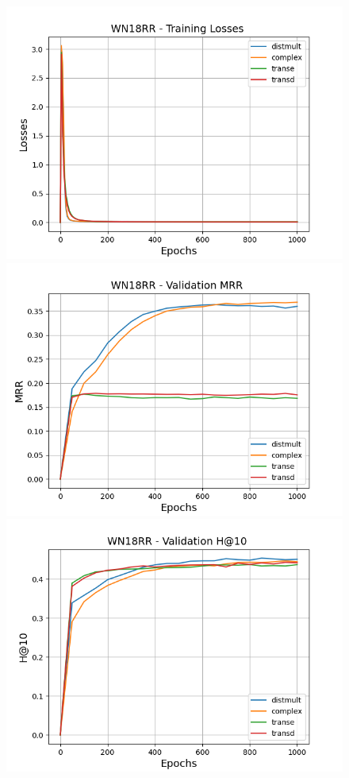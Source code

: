 \begin{figure}
    \centering
    \begin{minipage}{.3\textwidth}
      \centering
      \includegraphics[width=0.9\linewidth]{figures/results/pretrain/wn18rr/pretrain_wn18rr_losses.png}
    \end{minipage}%
    \begin{minipage}{.3\textwidth}
      \centering
      \includegraphics[width=0.9\linewidth]{figures/results/pretrain/wn18rr/pretrain_wn18rr_mrrs.png}
    \end{minipage}
    \begin{minipage}{.3\textwidth}
      \centering
      \includegraphics[width=0.9\linewidth]{figures/results/pretrain/wn18rr/pretrain_wn18rr_hit10s.png}

\end{minipage}
\end{figure}
